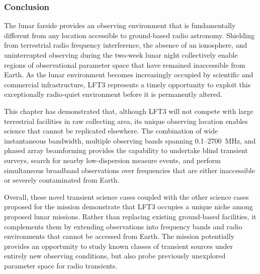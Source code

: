
\subsubsection{Conclusion}

The lunar farside provides an observing environment that is fundamentally different from any location accessible to ground-based radio astronomy. Shielding from terrestrial radio frequency interference, the absence of an ionosphere, and uninterrupted observing during the two-week lunar night collectively enable regions of observational parameter space that have remained inaccessible from Earth. As the lunar environment becomes increasingly occupied by scientific and commercial infrastructure, LFT3 represents a timely opportunity to exploit this exceptionally radio-quiet environment before it is permanently altered.

This chapter has demonstrated that, although LFT3 will not compete with large terrestrial facilities in raw collecting area, its unique observing location enables science that cannot be replicated elsewhere. The combination of wide instantaneous bandwidth, multiple observing bands spanning 0.1--2700~MHz, and phased array beamforming provides the capability to undertake blind transient surveys, search for nearby low-dispersion measure events, and perform simultaneous broadband observations over frequencies that are either inaccessible or severely contaminated from Earth.

Overall, these novel transient science cases coupled with the other science cases proposed for the mission \citep{DeBoer2026LFT3MNRASS} demonstrate that LFT3 occupies a unique niche among proposed lunar missions. Rather than replacing existing ground-based facilities, it complements them by extending observations into frequency bands and radio environments that cannot be accessed from Earth. The mission potentially provides an opportunity to study known classes of transient sources under entirely new observing conditions, but also probe previously unexplored parameter space for radio transients. 
